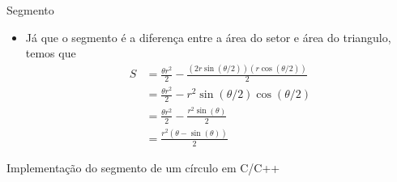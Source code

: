 \begin{frame}[fragile]{Segmento}

    \begin{itemize}
        \item Já que o segmento é a diferença entre a área do setor e área do triangulo, temos que
        \begin{align*}
            S &= \frac{\theta r^2}{2} - \frac{(2r\sin(\theta/2))(r\cos(\theta/2))}{2} \\
            &= \frac{\theta r^2}{2} - r^2\sin(\theta/2)\cos(\theta/2)\\
            &= \frac{\theta r^2}{2} - \frac{r^2\sin(\theta)}{2}\\
            &= \frac{r^2(\theta - \sin(\theta))}{2}
        \end{align*}
 
    \end{itemize}

\end{frame}

\begin{frame}[fragile]{Implementação do segmento de um círculo em C/C++}
\end{frame}
